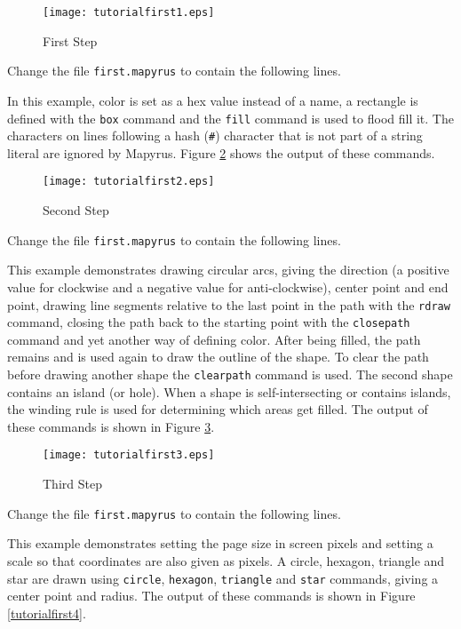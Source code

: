 \begin{figure}[htb]
\texttt{[image: tutorialfirst1.eps]}
\caption{First Step}
\label{tutorialfirst1}
\end{figure}


Change the file \texttt{first.mapyrus} to contain the following lines.



In this example, color is set as a hex value instead of a name,
a rectangle is defined with the \texttt{box} command
and the \texttt{fill} command is used to
flood fill it.
The characters on lines following a hash (\texttt{\#}) character that
is not part of a string literal are ignored by Mapyrus.
Figure \ref{tutorialfirst2} shows the output of these commands.

\begin{figure}[htb]
\texttt{[image: tutorialfirst2.eps]}
\caption{Second Step}
\label{tutorialfirst2}
\end{figure}

Change the file \texttt{first.mapyrus} to contain the following lines.



This example demonstrates drawing circular arcs,
giving the direction (a positive value for clockwise and a negative
value for anti-clockwise), center point and end point,
drawing line segments relative to the last point in the path
with the \texttt{rdraw} command,
closing the path back to the starting point
with the \texttt{closepath} command and
yet another way of defining color.
After being filled, the path remains and is used again to draw the outline
of the shape.
To clear the path before drawing another shape the
\texttt{clearpath}
command is used.
The second shape contains an island (or hole).  When a shape is
self-intersecting or contains islands, the winding rule is
used for determining which areas get filled.
The output of these commands is shown in Figure \ref{tutorialfirst3}.

\begin{figure}[htb]
\texttt{[image: tutorialfirst3.eps]}
\caption{Third Step}
\label{tutorialfirst3}
\end{figure}

Change the file \texttt{first.mapyrus} to contain the following lines.



This example demonstrates setting the page size in
screen pixels and setting a scale so that coordinates
are also given as pixels.
A circle, hexagon, triangle and star are drawn using \texttt{circle},
\texttt{hexagon}, \texttt{triangle} and \texttt{star} commands,
giving a center point and radius.
The output of these commands is shown in Figure \ref{tutorialfirst4}.

